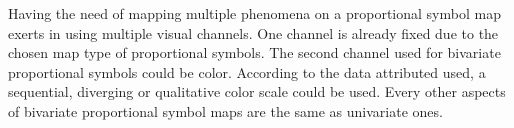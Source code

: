 Having the need of mapping multiple phenomena on a proportional symbol map exerts in using multiple visual channels. One channel is already fixed due to the chosen map type of proportional symbols. The second channel used for bivariate proportional symbols could be color. According to the data attributed used, a sequential, diverging or qualitative color scale could be used. Every other aspects of bivariate proportional symbol maps are the same as univariate ones.